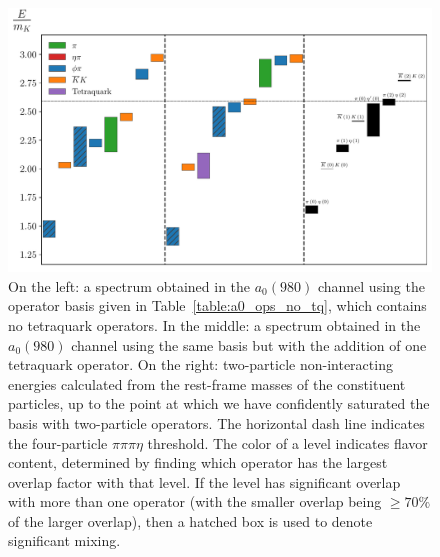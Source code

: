 \begin{figure}
  \centering
  \hspace*{-0.5in}\includegraphics[width=\textwidth]{figures/spectrum_a1gm/staircase.pdf}
  \caption{On the left: a spectrum obtained in the $a_0(980)$ channel using the operator basis given in Table~\ref{table:a0_ops_no_tq}, which contains no tetraquark operators. In the middle: a spectrum obtained in the $a_0(980)$ channel using the same basis but with the addition of one tetraquark operator. On the right: two-particle non-interacting energies calculated from the rest-frame masses of the constituent particles, up to the point at which we have confidently saturated the basis with two-particle operators. The horizontal dash line indicates the four-particle $\pi\pi\pi\eta$ threshold. The color of a level indicates flavor content, determined by finding which operator has the largest overlap factor with that level. If the level has significant overlap with more than one operator (with the smaller overlap being $\geq 70\%$ of the larger overlap), then a hatched box is used to denote significant mixing.}
  \label{fig:a0_spectrum}
\end{figure}

